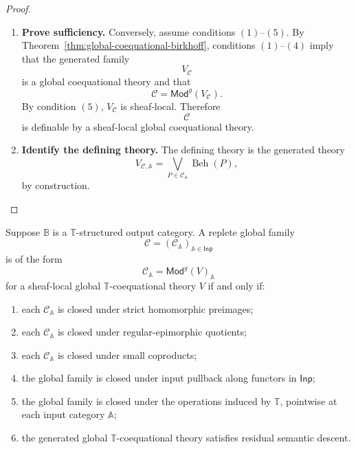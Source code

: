 \begin{proof}
\begin{enumerate}
        \item \textbf{Prove sufficiency.}
        Conversely, assume conditions \((1)\)--\((5)\). By
        Theorem~\ref{thm:global-coequational-birkhoff}, conditions
        \((1)\)--\((4)\) imply that the generated family
        \[
            V_{\mathcal C}
        \]
        is a global coequational theory and that
        \[
            \mathcal C
            =
            \mathsf{Mod}^{g}(V_{\mathcal C}).
        \]
        By condition \((5)\), \(V_{\mathcal C}\) is sheaf-local. Therefore
        \[
            \mathcal C
        \]
        is definable by a sheaf-local global coequational theory.

        \item \textbf{Identify the defining theory.}
        The defining theory is the generated theory
        \[
            V_{\mathcal C,\mathbb A}
            =
            \bigvee_{P\in\mathcal C_{\mathbb A}}
            \operatorname{Beh}(P),
        \]
        by construction.
    \end{enumerate}
\end{proof}

\begin{corollary}
\label{cor:structured-sheaf-local-birkhoff}
    Suppose \(\mathbb B\) is a \(\mathbb T\)-structured output category. A
    replete global family
    \[
        \mathcal C=(\mathcal C_{\mathbb A})_{\mathbb A\in\mathsf{Inp}}
    \]
    is of the form
    \[
        \mathcal C_{\mathbb A}
        =
        \mathsf{Mod}^{g}(V)_{\mathbb A}
    \]
    for a sheaf-local global \(\mathbb T\)-coequational theory \(V\) if and
    only if:
    \begin{enumerate}
        \item each \(\mathcal C_{\mathbb A}\) is closed under strict
        homomorphic preimages;
        \item each \(\mathcal C_{\mathbb A}\) is closed under
        regular-epimorphic quotients;
        \item each \(\mathcal C_{\mathbb A}\) is closed under small
        coproducts;
        \item the global family is closed under input pullback along functors
        in \(\mathsf{Inp}\);
        \item the global family is closed under the operations induced by
        \(\mathbb T\), pointwise at each input category \(\mathbb A\);
        \item the generated global \(\mathbb T\)-coequational theory satisfies
        residual semantic descent.
    \end{enumerate}
\end{corollary}

